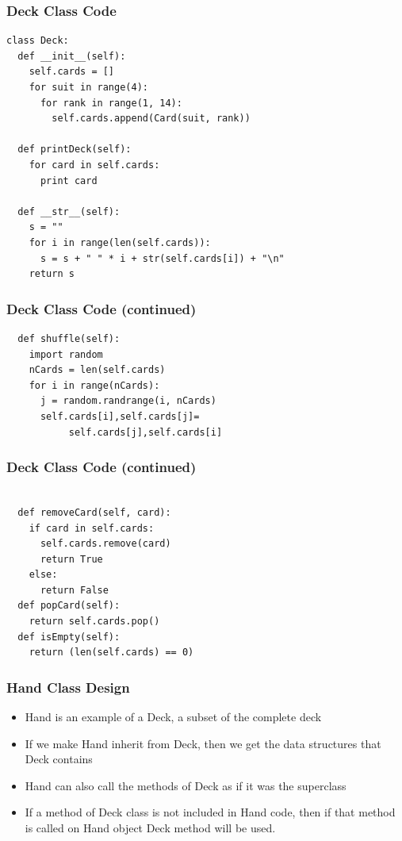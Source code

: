 \documentclass{beamer}
\begin{document}
\begin{frame}[fragile]
\frametitle{Deck Class Code}
\begin{lstlisting}
class Deck:
  def __init__(self):
    self.cards = []
    for suit in range(4):
      for rank in range(1, 14):
        self.cards.append(Card(suit, rank))

  def printDeck(self):
    for card in self.cards:
      print card 

  def __str__(self):
    s = ""
    for i in range(len(self.cards)):
      s = s + " " * i + str(self.cards[i]) + "\n"
    return s

\end{lstlisting}
\end{frame}

\begin{frame}[fragile]
\frametitle{Deck Class Code (continued)}
\fontvi
\begin{lstlisting}
  def shuffle(self):
    import random
    nCards = len(self.cards)
    for i in range(nCards):
      j = random.randrange(i, nCards)
      self.cards[i],self.cards[j]=
           self.cards[j],self.cards[i]
\end{lstlisting}
\end{frame}
           

 \begin{frame}[fragile]
\frametitle{Deck Class Code (continued)}
\fontvi
\begin{lstlisting}
          
  def removeCard(self, card):
    if card in self.cards:
      self.cards.remove(card)
      return True
    else:
      return False
  def popCard(self):
    return self.cards.pop()
  def isEmpty(self):
    return (len(self.cards) == 0)
\end{lstlisting}
\end{frame}

\begin{frame}[fragile]
\frametitle{Hand Class Design}
\begin{itemize}
\item Hand is an example of a Deck, a subset of the complete deck
\item If we make Hand inherit from Deck, then we get the data structures that Deck contains
\item Hand can also call the methods of Deck as if it was the superclass
\item If a method of Deck class is not included in Hand code, then if that method is called on Hand object Deck method will be used.
\end{itemize} 
\end{frame}
\end{document}
